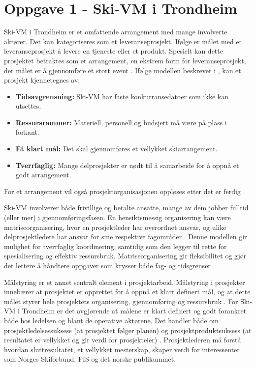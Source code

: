 \section{Oppgave 1 - Ski-VM i Trondheim}

Ski-VM i Trondheim er et omfattende arrangement med mange involverte aktører. Det kan kategoriseres som et leveranseprosjekt. Ifølge \parencite[][s.165]{Teknologiledelse} er målet med et leveranseprosjekt å levere en tjeneste eller et produkt. Spesielt kan dette prosjektet betraktes som et arrangement, en ekstrem form for leveranseprosjekt, der målet er å gjennomføre et stort event \parencite[][s.165]{Teknologiledelse}. Ifølge modellen beskrevet i \cite[][s.164]{Teknologiledelse}, kan et prosjekt kjennetegnes av:
\begin{itemize}
    \item \textbf{Tidsavgrensning:} Ski-VM har faste konkurransedatoer som ikke kan utsettes.
    \item \textbf{Ressursrammer:} Materiell, personell og budsjett må være på plass i forkant.
    \item \textbf{Et klart mål:} Det skal gjennomføres et vellykket skiarrangement.
    \item \textbf{Tverrfaglig:} Mange delprosjekter er nødt til å samarbeide for å oppnå et godt arrangement.
\end{itemize}
For et arrangement vil også prosjektorganisasjonen oppløses etter det er ferdig \parencite[][s.165]{Teknologiledelse}.  

Ski-VM involverer både frivillige og betalte ansatte, mange av dem jobber fulltid (eller mer) i gjennomføringsfasen. En hensiktsmessig organisering kan være matriseorganisering, hvor en prosjektleder har overordnet ansvar, og ulike delprosjektledere har ansvar for sine respektive fagområder \parencite[][s.166]{Teknologiledelse}. Denne modellen gir mulighet for tverrfaglig koordinering, samtidig som den legger til rette for spesialisering og effektiv ressursbruk. Matriseorganisering gir fleksibilitet og gjør det lettere å håndtere oppgaver som krysser både fag- og tidsgrenser \parencite[][s.166]{Teknologiledelse}.

Målstyring er et annet sentralt element i prosjektarbeid. Målstyring i prosjekter innebærer at prosjektet er opprettet for å oppnå et klart definert mål, og at dette målet styrer hele prosjektets organisering, gjennomføring og ressursbruk \parencite[][s.164]{Teknologiledelse}. For Ski-VM i Trondheim er det avgjørende at målene er klart definert og godt forankret både hos ledelsen og blant de operative aktørene. Det handler både om prosjektledelsessuksess (at prosjektet følger planen) og prosjektproduktsuksess (at resultatet er vellykket og gir verdi for prosjekteier) \parencite[][s.165]{Teknologiledelse}. Prosjektlederen må forstå hvordan sluttresultatet, et vellykket mesterskap, skaper verdi for interessenter som Norges Skiforbund, FIS og det norske publikummet.

